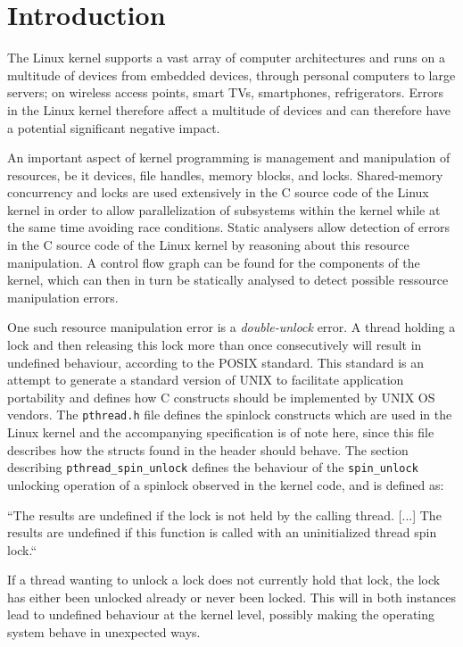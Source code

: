\section{Introduction}

\newpar The Linux kernel supports a vast array of computer architectures and runs on a multitude of devices from embedded devices, through personal computers to large servers; on wireless
access points, smart TVs, smartphones, refrigerators.
Errors in the Linux kernel therefore affect a multitude of devices and can therefore have a potential significant negative impact.

\newpar An important aspect of kernel programming is management and manipulation of resources, be it devices, file handles, memory blocks, and locks. Shared-memory concurrency and locks are used extensively in the C source code of the Linux kernel in order to allow parallelization of subsystems within the kernel while at the same time avoiding race conditions. Static analysers allow detection of errors in the C source code of the Linux kernel by reasoning about this resource manipulation. A control flow graph can be found for the components of the kernel, which can then in turn be statically analysed to detect possible ressource manipulation errors.

\newpar One such resource manipulation error is a \textit{double-unlock} error. A thread holding a lock and then releasing this lock more than once consecutively will result in undefined behaviour, according to the POSIX standard. This standard is an attempt to generate a standard version of UNIX to facilitate application portability and defines how C constructs should be implemented by UNIX OS vendors. The \texttt{pthread.h} file defines the spinlock constructs which are used in the Linux kernel and the accompanying specification is of note here, since this file describes how the structs found in the header should behave. The section describing \texttt{pthread\_spin\_unlock} defines the behaviour of the \texttt{spin\_unlock} unlocking operation of a spinlock observed in the kernel code, and is defined as:

\begin{center}
``The results are undefined if the lock is not held by the calling thread.
[...] 
The results are undefined if this function is called with an uninitialized thread spin lock.`` \cite{unlockPOSIX}
\end{center}

\newpar If a thread wanting to unlock a lock does not currently hold that lock, the lock has either been unlocked already or never been locked. This will in both instances lead to undefined behaviour at the kernel level, possibly making the operating system behave in unexpected ways.


